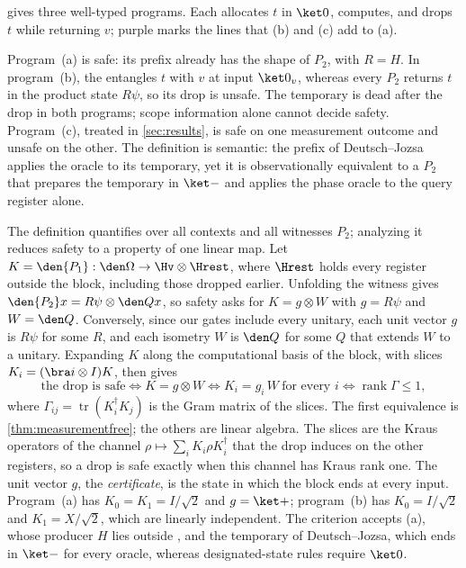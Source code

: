  gives three well-typed programs. Each allocates $t$ in $\ket0$, computes, and drops $t$ while
returning $v$; purple marks the lines that (b) and (c) add to (a).

\begingroup
\setlength{\topsep}{2pt}
\exRunning
\endgroup

Program~(a) is safe: its prefix already has the shape of $P_2$, with $R=H$. In program~(b), the 
entangles $t$ with $v$ at input $\ket0_v$, whereas every $P_2$ returns $t$ in the product state $R\psi$, so its
drop is unsafe. The temporary is dead after the drop in both programs; scope information alone cannot decide
safety. Program~(c), treated in \cref{sec:results}, is safe on one measurement outcome and unsafe on the other.
The definition is semantic: the prefix of Deutsch--Jozsa applies the oracle to its temporary, yet it is
observationally equivalent to a $P_2$ that prepares the temporary in $\ket-$ and applies the phase oracle to the
query register alone.

The definition quantifies over all contexts and all witnesses $P_2$; analyzing it reduces safety to a property
of one linear map. Let $K=\den{P_1}:\den\Omega\to\Hv\otimes\Hrest$, where $\Hrest$ holds every register outside
the block, including those dropped earlier. Unfolding the witness gives $\den{P_2}x=R\psi\otimes\den Qx$, so
safety asks for $K=g\otimes W$ with $g=R\psi$ and $W=\den Q$. Conversely, since our gates include every unitary,
each unit vector $g$ is $R\psi$ for some $R$, and each isometry $W$ is $\den Q$ for some $Q$ that extends $W$ to
a unitary. Expanding $K$ along the computational basis of the block, with slices $K_i=(\bra i\otimes I)K$, then
gives
\[
  \text{the drop is safe}
  \iff K=g\otimes W
  \iff K_i=g_i\,W\ \text{for every } i
  \iff \operatorname{rank}\Gamma\le1,
\]
where $\Gamma_{ij}=\operatorname{tr}(K_i^{\dagger}K_j)$ is the Gram matrix of the slices. The first equivalence
is \cref{thm:measurementfree}; the others are linear algebra. The slices are the Kraus operators of the channel
$\rho\mapsto\sum_iK_i\rho K_i^{\dagger}$ that the drop induces on the other registers, so a drop is safe exactly
when this channel has Kraus rank one. The unit vector $g$, the \emph{certificate}, is the state in which the
block ends at every input. Program~(a) has $K_0=K_1=I/\sqrt2$ and $g=\ket+$; program~(b) has $K_0=I/\sqrt2$ and
$K_1=X/\sqrt2$, which are linearly independent. The criterion accepts (a), whose producer $H$ lies outside
, and the temporary of Deutsch--Jozsa, which ends in $\ket-$ for every oracle, whereas designated-state
rules require $\ket0$.

